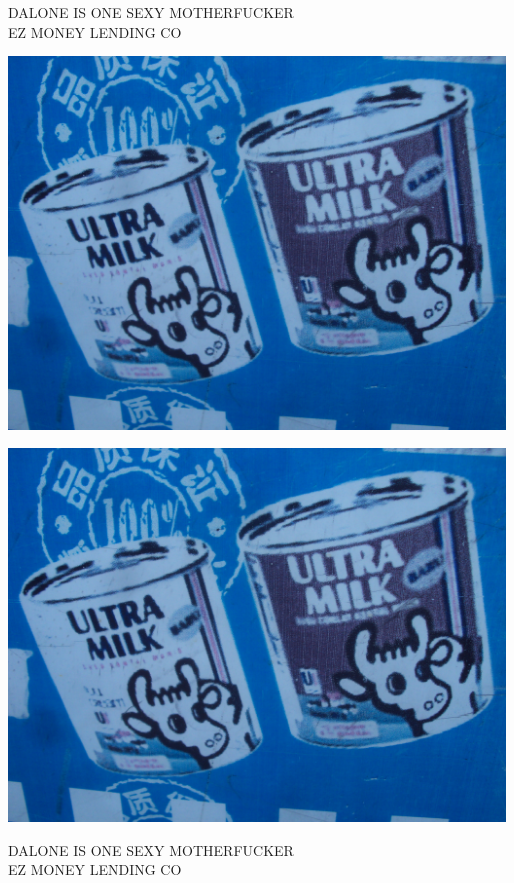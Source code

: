 \documentclass[10pt,letterpaper]{article}
\begin{document}
DALONE IS ONE SEXY MOTHERFUCKER\\
EZ MONEY LENDING CO\\
\pagebreak

\includegraphics[width=5.19in]{landscape.jpg}

\vspace{0.25in}
\includegraphics[width=5.19in]{landscape.jpg}

DALONE IS ONE SEXY MOTHERFUCKER\\
EZ MONEY LENDING CO\\
\pagebreak
\end{document}
